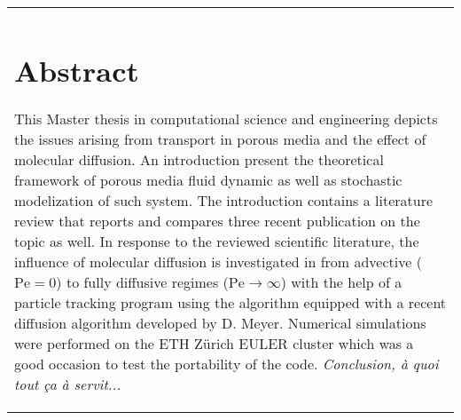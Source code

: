 \begin{tabular}{p{}}
\chapter*{Abstract}

This Master thesis in computational science and engineering depicts the issues arising from transport in porous media and the effect of molecular diffusion. An introduction present the theoretical framework of porous media fluid dynamic as well as stochastic modelization of such system. The introduction contains a literature review that reports and compares three recent publication on the topic as well.
In response to the reviewed scientific literature, the influence of molecular diffusion is investigated in from advective ($\mathrm{Pe} = 0$) to fully diffusive regimes ($\mathrm{Pe}\rightarrow \infty$) with the help of a particle tracking program using the \citet{Pollock1988} algorithm equipped with a recent diffusion algorithm developed by D. Meyer. 
Numerical simulations were performed on the ETH Zürich EULER cluster which was a good occasion to test the portability of the code.
\textit{Conclusion, à quoi tout ça à servit...}
\end{tabular}
